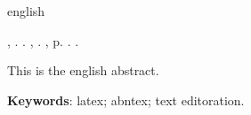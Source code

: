 \begin{resumo}[Abstract]
    \begin{otherlanguage*}{english}

\begin{flushleft}
\MakeUppercase{\imprimirSobrenome}, \imprimirPrimeirosNomes. \textbf{\imprimirTituloEmIngles}. \imprimirtipotrabalhoIngles, \imprimirinstituicaoIngles. \imprimirlocal,  p. \pageref{LastPage}. \imprimirAnoDeDefesa.
\end{flushleft}

        \fonteResumo
        This is the english abstract.
    
        \vspace{\onelineskip}
     
        \noindent 
        \textbf{Keywords}: latex; abntex; text editoration.
    \end{otherlanguage*}
\end{resumo}
